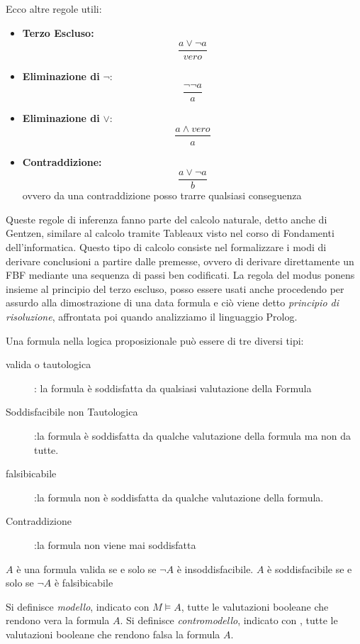 \documentclass[a4paper]{report}
\begin{document}
\begin{esempio}
Ecco altre regole utili:
\begin{itemize}
\item \textbf{Terzo Escluso:}
$$\frac{a \lor \neg a}{vero}$$
\item \textbf{Eliminazione di} $\neg$:
$$\frac{\neg \neg a}{a}$$
\item \textbf{Eliminazione di} $\vee$:
$$\frac{a \land vero}{a}$$
\item \textbf{Contraddizione:}
$$\frac{a \lor \neg a}{b}$$
ovvero da una contraddizione posso trarre qualsiasi conseguenza
\end{itemize}
\end{esempio}
Queste regole di inferenza fanno parte del calcolo naturale, detto anche di Gentzen, similare al calcolo tramite Tableaux visto nel corso
di Fondamenti dell'informatica.\newline
Questo tipo di calcolo consiste nel formalizzare i modi di derivare conclusioni a partire dalle premesse, ovvero di derivare direttamente un FBF
mediante una sequenza di passi ben codificati.
La regola del modus ponens  insieme al principio del terzo escluso, posso essere usati anche procedendo per assurdo alla dimostrazione
di una data formula e ciò viene detto \emph{principio di risoluzione}, affrontata poi quando analizziamo il linguaggio Prolog.


Una formula nella logica proposizionale può essere di tre diversi tipi:
\begin{description}
    \item[valida o tautologica]: la formula è soddisfatta da qualsiasi valutazione della Formula
    \item[Soddisfacibile non Tautologica]:la formula è soddisfatta da qualche valutazione
                        della formula ma non da tutte.
    \item[falsibicabile]:la formula non è soddisfatta da qualche valutazione della formula.
    \item[Contraddizione]:la formula non viene mai soddisfatta
\end{description}

\begin{thm}
$A$ è una formula valida se e solo se $\neg A$ è insoddisfacibile.
$A$ è soddisfacibile se e solo se $\neg A$ è falsibicabile
\end{thm}

Si definisce \emph{modello}, indicato con $M \models A$, tutte le valutazioni booleane
che rendono vera la formula $A$.
Si definisce \emph{contromodello}, indicato con , tutte le valutazioni booleane
che rendono falsa la formula $A$.
\end{document}
